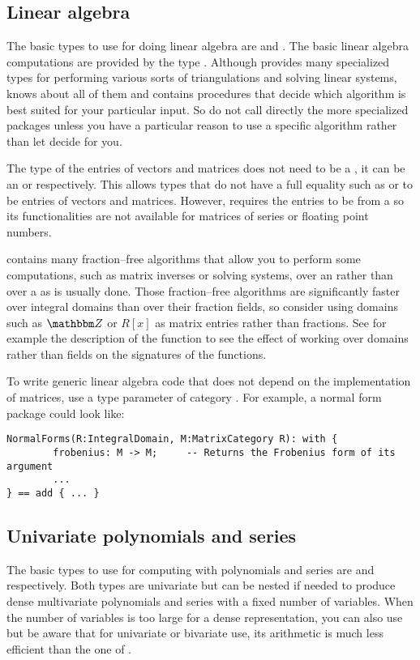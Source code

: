 \subsection{Linear algebra}
The basic types to use for doing linear algebra
are  and .
The basic linear algebra computations are provided
by the type . Although
\libalgebra{} provides many specialized types for
performing various sorts of triangulations and solving
linear systems,  knows about all of
them and contains procedures that decide which algorithm is
best suited for your particular input. So do not call
directly the more specialized packages unless you have
a particular reason to use a specific algorithm rather
than let \libalgebra{} decide for you.

The type of the entries of vectors and matrices does
not need to be a , it can be an
 or  respectively.
This allows types that do not have a full equality such
as  or 
to be entries of vectors and matrices. However,
 requires the entries to be from
a  so its functionalities are
not available for matrices of series or floating point numbers.

\libalgebra{} contains many fraction--free algorithms that
allow you to perform
some computations, such as matrix inverses or solving systems,
over an  rather than over a 
as is usually done.
Those fraction--free
algorithms are significantly faster over integral domains than
over their fraction fields, so consider using domains
such as $\ZZ$ or $R[x]$ as matrix entries rather than
fractions. See for example the description of the
 function to see the
effect of working over domains rather than fields
on the signatures of the functions.

To write generic linear algebra code that does not depend
on the implementation of matrices, use a type parameter
of category . For example, a normal
form package could look like:
\begin{verbatim}
NormalForms(R:IntegralDomain, M:MatrixCategory R): with {
        frobenius: M -> M;     -- Returns the Frobenius form of its argument
        ...
} == add { ... }
\end{verbatim}

\subsection{Univariate polynomials and series}
The basic types to use for computing with polynomials and
series are 
and  respectively.
Both types are univariate but can be nested if needed to
produce dense multivariate polynomials and series with
a fixed number of variables. When the number of variables
is too large for a dense representation, you can also use
 but be aware that for
univariate or bivariate use, its arithmetic is much less 
efficient than the one of .

